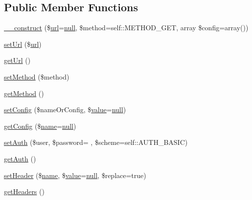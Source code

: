 \subsection*{Public Member Functions}
\begin{DoxyCompactItemize}
\item 
\hyperlink{classHTTP__Request2_a8dbfb11ace471827bd83792df59ded9f}{\+\_\+\+\_\+construct} (\$\hyperlink{swfupload_8js_a440a52a9004fdab0700100a6ddb49f67}{url}=\hyperlink{modernizr_8min_8js_a286f9ec831c5e676eeb493248eab9575}{null}, \$method=self\+::\+M\+E\+T\+H\+O\+D\+\_\+\+G\+ET, array \$config=array())
\item 
\hyperlink{classHTTP__Request2_a323cb019d1cb621ec9419941d42130d1}{set\+Url} (\$\hyperlink{swfupload_8js_a440a52a9004fdab0700100a6ddb49f67}{url})
\item 
\hyperlink{classHTTP__Request2_a35d9ef6e266d90ad52a5037b70850694}{get\+Url} ()
\item 
\hyperlink{classHTTP__Request2_a3372c369ddc092061cc15ff2f80a859f}{set\+Method} (\$method)
\item 
\hyperlink{classHTTP__Request2_a1a362b64dbeeb0321b55df04c6f2c820}{get\+Method} ()
\item 
\hyperlink{classHTTP__Request2_a57145f6158a2af444b1f7b3f38bcd0c9}{set\+Config} (\$name\+Or\+Config, \$\hyperlink{jquery_8js_abe5393d870043cf6aaa1d5ad5fce755c}{value}=\hyperlink{modernizr_8min_8js_a286f9ec831c5e676eeb493248eab9575}{null})
\item 
\hyperlink{classHTTP__Request2_a420485bbf5cc4a95399fe01138fe6ce6}{get\+Config} (\$\hyperlink{common_8js_a22c29d2aa8ed6161ce8faa718ef76e68}{name}=\hyperlink{modernizr_8min_8js_a286f9ec831c5e676eeb493248eab9575}{null})
\item 
\hyperlink{classHTTP__Request2_a3ed0781251e632a15aadaaff960ec854}{set\+Auth} (\$user, \$password= \textquotesingle{}\textquotesingle{}, \$scheme=self\+::\+A\+U\+T\+H\+\_\+\+B\+A\+S\+IC)
\item 
\hyperlink{classHTTP__Request2_a92573cc9573e255bd2a9fe476153898f}{get\+Auth} ()
\item 
\hyperlink{classHTTP__Request2_adbdceb126835d75826cc461c27d27b14}{set\+Header} (\$\hyperlink{common_8js_a22c29d2aa8ed6161ce8faa718ef76e68}{name}, \$\hyperlink{jquery_8js_abe5393d870043cf6aaa1d5ad5fce755c}{value}=\hyperlink{modernizr_8min_8js_a286f9ec831c5e676eeb493248eab9575}{null}, \$replace=true)
\item 
\hyperlink{classHTTP__Request2_a49ae39a8a6531b205b15496e42b994cf}{get\+Headers} ()
\item 

\end{DoxyCompactItemize}
